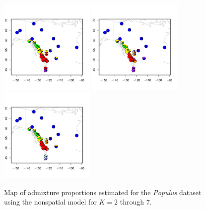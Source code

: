 \documentclass[12pt]{article}
\begin{document}
\begin{figure}
			{\includegraphics[width=1.8in,height=1.8in]{figs/populus/populus_nsp5.pdf}}
			{\includegraphics[width=1.8in,height=1.8in]{figs/populus/populus_nsp6.pdf}}
			{\includegraphics[width=1.8in,height=1.8in]{figs/populus/populus_nsp7.pdf}}
	\caption{
	Map of admixture proportions estimated for the \textit{Populus} dataset 
	using the nonspatial model for $K=2$ through 7.
    }\label{populus_nsp_pies}
\end{figure}
\end{document}
